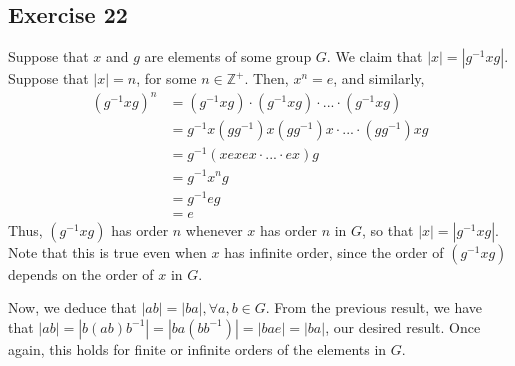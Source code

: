 \subsection*{Exercise 22}
Suppose that $x$ and $g$ are elements of some group $G$. We claim that $|x| = |g^{-1}xg|$. Suppose that $|x| = n$, for some $n \in \mathbb{Z}^+$. Then, $x^n = e$, and similarly, 
\begin{align*}
    (g^{-1}xg)^n &= (g^{-1}xg)\cdot(g^{-1}xg)\cdot...\cdot(g^{-1}xg)\\
    &= g^{-1}x(gg^{-1})x(gg^{-1})x\cdot...\cdot(gg^{-1})xg \\
    &= g^{-1}(xexex\cdot...\cdot ex)g \\
    &= g^{-1}x^ng \\
    &= g^{-1}eg \\
    &= e
\end{align*}
Thus, $(g^{-1}xg)$ has order $n$ whenever $x$ has order $n$ in $G$, so that $|x| = |g^{-1}xg|$. Note that this is true even when $x$ has infinite order, since the order of $(g^{-1}xg)$ depends on the order of $x$ in $G$.

Now, we deduce that $|ab| = |ba|, \forall a,b \in G$. From the previous result, we have that $|ab| = |b(ab)b^{-1}| = |ba(bb^{-1})| = |bae| = |ba|$, our desired result. Once again, this holds for finite or infinite orders of the elements in $G$.